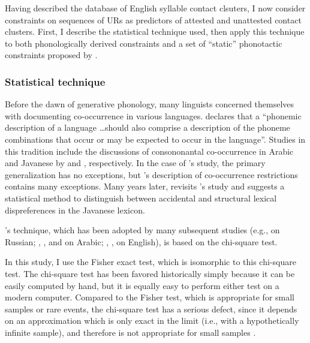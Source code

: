 
Having described the database of English syllable contact clsuters, I now consider constraints on sequences of URs as predictors of attested and unattested contact clusters. First, I describe the statistical technique used, then apply this technique to both phonologically derived constraints and a set of ``static'' phonotactic constraints proposed by \citet{Pierrehumbert1994}. 

\subsubsection{Statistical technique}

Before the dawn of generative phonology, many linguists concerned themselves with documenting co-occurrence in various languages. \citet[][28]{Vogt1954} declares that a ``phonemic description of a language \ldots should also comprise a description of the phoneme combinations that occur or may be expected to occur in the language''. Studies in this tradition include the discussions of consononantal co-occurrence in Arabic and Javanese by \citet{Greenberg1950} and \citet{Uhlenbeck1950}, respectively. In the case of \citet{Greenberg1950}'s study, the primary generalization has no exceptions, but \citeauthor{Uhlenbeck1950}'s description of co-occurrence restrictions contains many exceptions. Many years later, \citet{Mester1988} revisits \citeauthor{Uhlenbeck1950}'s study and suggests a statistical method to distinguish between accidental and structural lexical dispreferences in the Javanese lexicon. 

\citeauthor{Mester1988}'s technique, which has been adopted by many subsequent studies (e.g., \citealt{Padgett1992,Padgett1995} on Russian; \citealt{Pierrehumbert1993}, \citealt{Frisch1996}, and \citealt{Frisch2004} on Arabic; \citealt{Berkley1994b,Berkley1994a,Berkley2000}, \citealt{Dmitrieva2008a}, \citealt{Dmitrieva2008b} on English), is based on the chi-square test. 

In this study, I use the Fisher exact test, which is isomorphic to this chi-square test. The chi-square test has been favored historically simply because it can be easily computed by hand, but it is equally easy to perform either test on a modern computer. Compared to the Fisher test, which is appropriate for small samples or rare events, the chi-square test has a serious defect, since it depends on an approximation which is only exact in the limit (i.e., with a hypothetically infinite sample), and therefore is not appropriate for small samples \citep[e.g.,][142]{Mester1988}.

